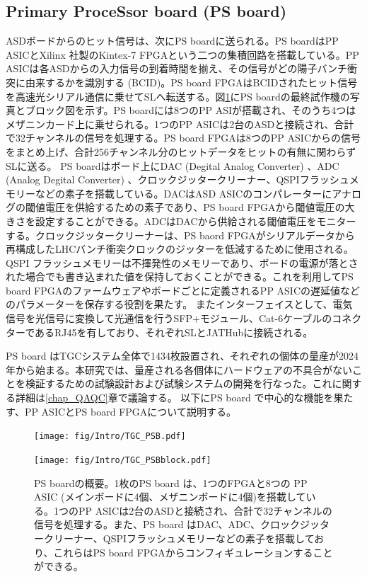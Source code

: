         \subsection*{Primary ProceSsor board (PS board)}
    ASDボードからのヒット信号は、次にPS boardに送られる。PS boardはPP ASICとXilinx 社製のKintex-7 FPGAという二つの集積回路を搭載している。PP ASICは各ASDからの入力信号の到着時間を揃え、その信号がどの陽子バンチ衝突に由来するかを識別する (BCID)。PS board FPGAはBCIDされたヒット信号を高速光シリアル通信に乗せてSLへ転送する。図\ref{TGC_PSB}にPS boardの最終試作機の写真とブロック図を示す。PS boardには8つのPP ASIが搭載され、そのうち4つはメザニンカード上に乗せられる。1つのPP ASICは2台のASDと接続され、合計で32チャンネルの信号を処理する。PS board FPGAは8つのPP ASICからの信号をまとめ上げ、合計256チャンネル分のヒットデータをヒットの有無に関わらずSLに送る。
    PS boardはボード上にDAC  (Degital Analog Converter) 、ADC  (Analog Degital Converter) 、クロックジッタークリーナー、QSPIフラッシュメモリーなどの素子を搭載している。DACはASD ASICのコンパレーターにアナログの閾値電圧を供給するための素子であり、PS board FPGAから閾値電圧の大きさを設定することができる。ADCはDACから供給される閾値電圧をモニターする。クロックジッタークリーナーは、PS baord FPGAがシリアルデータから再構成したLHCバンチ衝突クロックのジッターを低減するために使用される。QSPI フラッシュメモリーは不揮発性のメモリーであり、ボードの電源が落とされた場合でも書き込まれた値を保持しておくことができる。これを利用してPS board FPGAのファームウェアやボードごとに定義されるPP ASICの遅延値などのパラメーターを保存する役割を果たす。
    またインターフェイスとして、電気信号を光信号に変換して光通信を行うSFP+モジュール、Cat-6ケーブルのコネクターであるRJ45を有しており、それぞれSLとJATHubに接続される。
    
    PS board はTGCシステム全体で1434枚設置され、それぞれの個体の量産が2024年から始まる。本研究では、量産される各個体にハードウェアの不具合がないことを検証するための試験設計および試験システムの開発を行なった。これに関する詳細は\ref{chap_QAQC}章で議論する。
    以下にPS board で中心的な機能を果たす、PP ASICとPS board FPGAについて説明する。

    \begin{figure}
    \begin{minipage}[b]{.5\linewidth}
    \centering
    \texttt{[image: fig/Intro/TGC\_PSB.pdf]}
    \end{minipage}%
    \begin{minipage}[b]{.5\linewidth}
    \centering
    \texttt{[image: fig/Intro/TGC\_PSBblock.pdf]}
    \end{minipage}%
    \caption[PS boardの概要]{PS boardの概要。1枚のPS board は、1つのFPGAと8つの PP ASIC (メインボードに4個、メザニンボードに4個)を搭載している。1つのPP ASICは2台のASDと接続され、合計で32チャンネルの信号を処理する。また、PS board はDAC、ADC、クロックジッタークリーナー、QSPIフラッシュメモリーなどの素子を搭載しており、これらはPS board FPGAからコンフィギュレーションすることができる。}
    \label{TGC_PSB}
    \end{figure}

